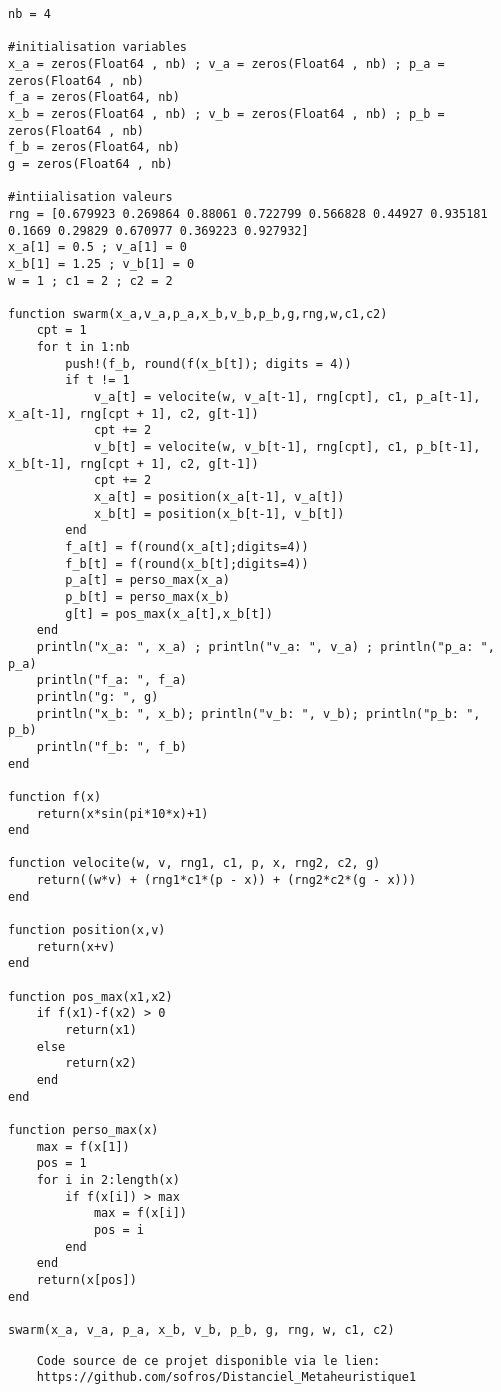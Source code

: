 \begin{lstlisting}
nb = 4

#initialisation variables
x_a = zeros(Float64 , nb) ; v_a = zeros(Float64 , nb) ; p_a = zeros(Float64 , nb)
f_a = zeros(Float64, nb)
x_b = zeros(Float64 , nb) ; v_b = zeros(Float64 , nb) ; p_b = zeros(Float64 , nb)
f_b = zeros(Float64, nb)
g = zeros(Float64 , nb)

#intiialisation valeurs
rng = [0.679923 0.269864 0.88061 0.722799 0.566828 0.44927 0.935181 0.1669 0.29829 0.670977 0.369223 0.927932]
x_a[1] = 0.5 ; v_a[1] = 0
x_b[1] = 1.25 ; v_b[1] = 0
w = 1 ; c1 = 2 ; c2 = 2

function swarm(x_a,v_a,p_a,x_b,v_b,p_b,g,rng,w,c1,c2)
    cpt = 1
    for t in 1:nb
        push!(f_b, round(f(x_b[t]); digits = 4))
        if t != 1
            v_a[t] = velocite(w, v_a[t-1], rng[cpt], c1, p_a[t-1], x_a[t-1], rng[cpt + 1], c2, g[t-1])
            cpt += 2
            v_b[t] = velocite(w, v_b[t-1], rng[cpt], c1, p_b[t-1], x_b[t-1], rng[cpt + 1], c2, g[t-1])
            cpt += 2
            x_a[t] = position(x_a[t-1], v_a[t])
            x_b[t] = position(x_b[t-1], v_b[t])
        end
        f_a[t] = f(round(x_a[t];digits=4))
        f_b[t] = f(round(x_b[t];digits=4))
        p_a[t] = perso_max(x_a)
        p_b[t] = perso_max(x_b)
        g[t] = pos_max(x_a[t],x_b[t])
    end
    println("x_a: ", x_a) ; println("v_a: ", v_a) ; println("p_a: ", p_a)
    println("f_a: ", f_a)
    println("g: ", g)
    println("x_b: ", x_b); println("v_b: ", v_b); println("p_b: ", p_b)
    println("f_b: ", f_b)
end

function f(x)
    return(x*sin(pi*10*x)+1)
end

function velocite(w, v, rng1, c1, p, x, rng2, c2, g)
    return((w*v) + (rng1*c1*(p - x)) + (rng2*c2*(g - x)))
end

function position(x,v)
    return(x+v)
end

function pos_max(x1,x2)
    if f(x1)-f(x2) > 0
        return(x1)
    else
        return(x2)
    end
end

function perso_max(x)
    max = f(x[1])
    pos = 1
    for i in 2:length(x)
        if f(x[i]) > max
            max = f(x[i])
            pos = i
        end
    end
    return(x[pos])
end

swarm(x_a, v_a, p_a, x_b, v_b, p_b, g, rng, w, c1, c2)

\end{lstlisting}

\begin{verbatim}
    Code source de ce projet disponible via le lien:
    https://github.com/sofros/Distanciel_Metaheuristique1
\end{verbatim}